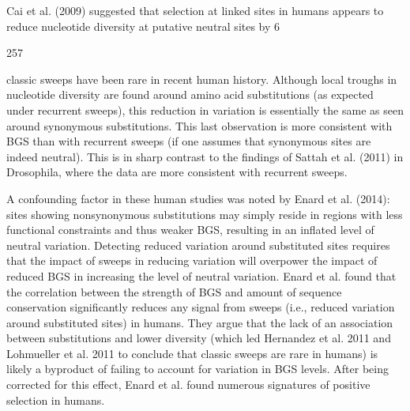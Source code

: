 \documentclass{article}
\begin{document}
Cai et al. (2009) suggested that selection at linked sites in humans appears to reduce nucleotide diversity at putative neutral sites by 6%

257

classic sweeps have been rare in recent human history. Although local troughs in nucleotide diversity are found around amino acid substitutions (as expected under recurrent sweeps), this reduction in variation is essentially the same as seen around synonymous substitutions. This last observation is more consistent with BGS than with recurrent sweeps (if one assumes that synonymous sites are indeed neutral). This is in sharp contrast to the findings of Sattah et al. (2011) in Drosophila, where the data are more consistent with recurrent sweeps.

A confounding factor in these human studies was noted by Enard et al. (2014): sites showing nonsynonymous substitutions may simply reside in regions with less functional constraints and thus weaker BGS, resulting in an inflated level of neutral variation. Detecting reduced variation around substituted sites requires that the impact of sweeps in reducing variation will overpower the impact of reduced BGS in increasing the level of neutral variation. Enard et al. found that the correlation between the strength of BGS and amount of sequence conservation significantly reduces any signal from sweeps (i.e., reduced variation around substituted sites) in humans. They argue that the lack of an association between substitutions and lower diversity (which led Hernandez et al. 2011 and Lohmueller et al. 2011 to conclude that classic sweeps are rare in humans) is likely a byproduct of failing to account for variation in BGS levels. After being corrected for this effect, Enard et al. found numerous signatures of positive selection in humans.
\end{document}
